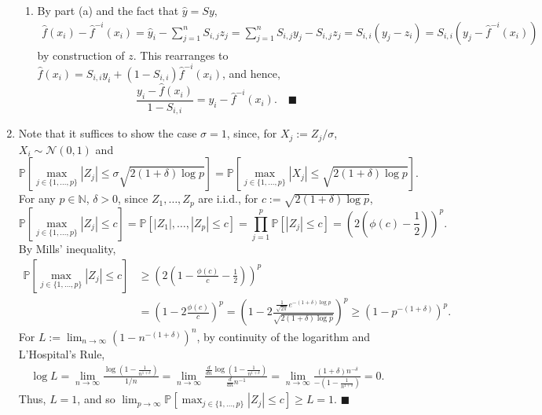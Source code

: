\documentclass[11pt]{article}
\renewcommand{\qed}{\quad \ensuremath{\blacksquare}}
\newcommand{\inv}{^{-1}}
\newcommand{\pr}{\mathbb{P}} %
\newcommand{\N}{\mathbb{N}} %
\renewcommand{\hat}{\widehat}
\begin{document}
\begin{enumerate}
\begin{enumerate}
\item By part (a) and the fact that $\hat y = S y$,
\begin{align*}
\hat f(x_i) - \hat f^{-i}(x_i)
    = \hat y_i - \sum_{j = 1}^n S_{i,j} z_j
    = \sum_{j = 1}^n S_{i,j} y_j - S_{i,j} z_j
    = S_{i,i} \left( y_j - z_i \right)
    = S_{i,i} \left( y_j - \hat f^{-i}(x_i) \right)
\end{align*}
by construction of $z$. This rearranges to
$\hat f(x_i) = S_{i,i} y_i + (1 - S_{i,i}) \hat f^{-i}(x_i)$,
and hence,
\[\frac{y_i - \hat f(x_i)}{1 - S_{i,i}} = y_i - \hat f^{-i}(x_i). \qed\]

\end{enumerate}

\item
Note that it suffices to show the case $\sigma = 1$, since, for
$X_j := Z_j/\sigma$, $X_i \sim \mathcal{N}(0,1)$ and
\[\pr\left[ \max_{j \in \{1,\dots,p\}} |Z_j|
                                \leq \sigma \sqrt{2(1 + \delta)\log p} \right]
    = \pr\left[ \max_{j \in \{1,\dots,p\}} |X_j|
                                    \leq \sqrt{2(1 + \delta)\log p} \right].\]
For any $p \in \N$, $\delta > 0$, since $Z_1,\dots,Z_p$ are i.i.d., for
$c := \sqrt{2(1 + \delta)\log p}$,
\[\pr\left[ \max_{j \in \{1,\dots,p\}} |Z_j| \leq c \right]
    = \pr\left[ |Z_1|,\dots,|Z_p| \leq c \right]
    = \prod_{j = 1}^p \pr\left[ |Z_j| \leq c \right]
    = \left( 2\left( \phi(c) - \frac12 \right) \right)^p.\]
By Mills' inequality,
\begin{align*}
\pr\left[ \max_{j \in \{1,\dots,p\}} |Z_j| \leq c \right]
 &  \geq \left( 2\left( 1 - \frac{\phi(c)}{c} - \frac12 \right) \right)^p   \\
 &  = \left( 1 - 2\frac{\phi(c)}{c} \right)^p
    = \left( 1 - 2\frac{\frac{1}{\sqrt{2\pi}}e^{-(1 + \delta) \log p}}{\sqrt{2(1 + \delta)\log p}} \right)^p
    \geq \left( 1 - p^{-(1 + \delta)} \right)^p.
\end{align*}
For $L := \lim_{n \to \infty} \left( 1 - n^{-(1 + \delta)} \right)^n$, by
continuity of the logarithm and L'Hospital's Rule,
\begin{align*}
\log L = \lim_{n \to \infty}
                \frac{\log \left( 1 - \frac{1}{n^{1 + \delta}} \right)}{1/n}
    = \lim_{n \to \infty}
        \frac{\frac{d}{dn} \log \left( 1 - \frac{1}{n^{1 + \delta}} \right)}
        {\frac{d}{dn} n\inv}
    = \lim_{n \to \infty}
        \frac{(1 + \delta)n^{-\delta}}
        {-\left( 1 - \frac{1}{n^{1 + \delta}} \right)}
    = 0.
\end{align*}
Thus, $L = 1$, and so
$\lim_{p \to \infty} \pr\left[ \max_{j \in \{1,\dots,p\}} |Z_j| \leq c \right]
    \geq L = 1$. \qed


\end{enumerate}
\end{document}
